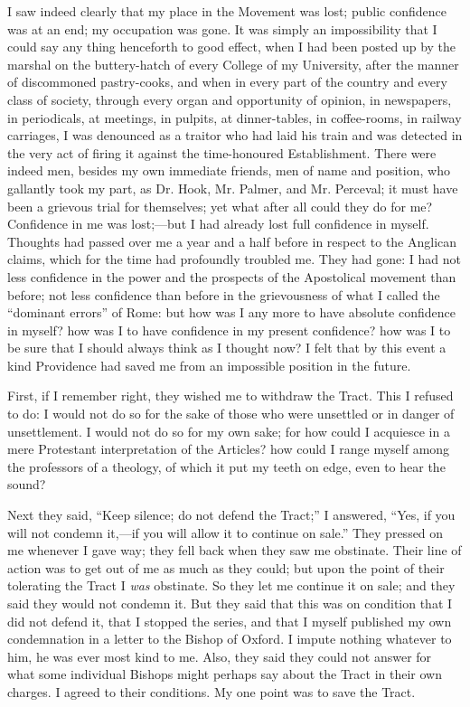 I saw indeed clearly that my place in the Movement was lost; public
confidence was at an end; my occupation was gone. It was simply an
impossibility that I could say any thing henceforth to good effect, when
I had been posted up by the marshal on the buttery-hatch of every
College of my University, after the manner of discommoned pastry-cooks,
and when in every part of the country and every class of society,
through every organ and opportunity of opinion, in newspapers,
in periodicals, at meetings, in pulpits, at dinner-tables, in
coffee-rooms, in railway carriages, I was denounced as a traitor who had
laid his train and was detected in the very act of firing it against the
time-honoured Establishment. There were indeed men, besides my own immediate friends, men of name and position, who gallantly took
my part, as Dr. Hook, Mr. Palmer, and Mr. Perceval; it must have been a
grievous trial for themselves; yet what after all could they do
for me? Confidence in me was lost;—but I had already lost full
confidence in myself. Thoughts had passed over me a year and a half
before in respect to the Anglican claims, which for the time had
profoundly troubled me. They had gone: I had not less confidence in the
power and the prospects of the Apostolical movement than before; not
less confidence than before in the grievousness of what I called the
``dominant errors'' of Rome: but how was I any more to have
absolute confidence in myself? how was I to have confidence in my
present confidence? how was I to be sure that I should always think as I
thought now? I felt that by this event a kind Providence had saved me
from an impossible position in the future.

First, if I remember right, they wished me to withdraw the Tract.
This I refused to do: I would not do so for the sake of those who were
unsettled or in danger of unsettlement. I would not do so for my own
sake; for how could I acquiesce in a mere Protestant interpretation of
the Articles? how could I range myself among the professors of a
theology, of which it put my teeth on edge, even to hear the sound?

Next they said, ``Keep silence; do not defend the Tract;'' I
answered, ``Yes, if you will not condemn it,—if you will allow it
to continue on sale.'' They pressed on me whenever I gave way; they
fell back when they saw me obstinate. Their line of action was to get
out of me as much as they could; but upon the point of their tolerating
the Tract I \emph{was} obstinate. So they let me continue it on sale; and they
said they would not condemn it. But they said that this was on condition
that I did not defend it, that I stopped the series, and that I myself
published my own condemnation in a letter to the Bishop of Oxford. I
impute nothing whatever to him, he was ever most kind to me. Also, they
said they could not answer for what some individual Bishops
might perhaps say about the Tract in their own charges. I agreed to
their conditions. My one point was to save the Tract.

